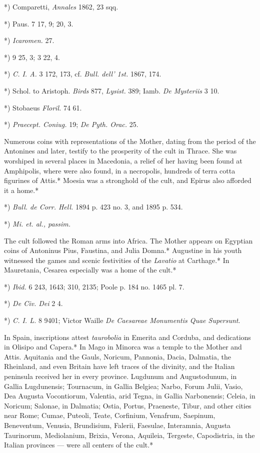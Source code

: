 \documentclass[a4paper, 11pt, oneside, polutonikogreek, english]{article}
\begin{document}
*) Comparetti, \emph{Annales} 1862, 23 sqq.

*) Paus. 7 17, 9; 20, 3.

*) \emph{Icaromen.} 27.

*) 9 25, 3; 3 22, 4.

*) \emph{C. I. A.} 3 172, 173, cf. \emph{Bull. dell' 1st.} 1867, 174.

*) Schol. to Aristoph. \emph{Birds} 877, \emph{Lysist.} 389; Iamb. \emph{De Mysteriis} 3 10.

*) Stobaeus \emph{Floril.} 74 61.

*) \emph{Praecept. Coniug.} 19; \emph{De Pyth. Orac.} 25.

Numerous coins with representations of the Mother, dating from the period of the Antonines and later, testify to the prosperity of the cult in Thrace. She was worshiped in several places in Macedonia, a relief of her having been found at Amphipolis, where were also found, in a necropolis, hundreds of terra cotta figurines of Attis.* Moesia was a stronghold of the cult, and Epirus also afforded it a home.*

*) \emph{Bull. de Corr. Hell.} 1894 p. 423 no. 3, and 1895 p. 534.

*) \emph{Mi. et. al., passim.}

The cult followed the Roman arms into Africa. The Mother appears on Egyptian coins of Antoninus Pius, Faustina, and Julia Domna.* Augustine in his youth witnessed the games and scenic festivities of the \emph{Lavatio} at Carthage.* In Mauretania, Cesarea especially was a home of the cult.*

*) \emph{Ibid.} 6 243, 1643; 310, 2135; Poole p. 184 no. 1465 pl. 7.

*) \emph{De Civ. Dei} 2 4.

*) \emph{C. I. L.} 8 9401; Victor Waille \emph{De Caesareae Monumentis Quae Supersunt}.

In Spain, inscriptions attest \emph{taurobolia} in Emerita and Corduba, and dedications in Olisipo and Capera.* In Mago in Minorca was a temple to the Mother and Attis. Aquitania and the Gauls, Noricum, Pannonia, Dacia, Dalmatia, the Rheinland, and even Britain have left traces of the divinity, and the Italian peninsula received her in every province. Lugdunum and Augustodunum, in Gallia Lugdunensis; Tournacum, in Gallia Belgiea; Narbo, Forum Julii, Vasio, Dea Augusta Vocontiorum, Valentia, arid Tegna, in Gallia Narbonensis; Celeia, in Noricum; Salonae, in Dalmatia; Ostia, Portus, Praeneste, Tibur, and other cities near Rome; Cumae, Puteoli, Teate, Corfinium, Venafrum, Saepinum, Beneventum, Venusia, Brundisium, Falerii, Faesulae, Interamnia, Augusta Taurinorum, Mediolanium, Brixia, Verona, Aquileia, Tergeste, Capodistria, in the Italian provinces --- were all centers of the cult.*
\end{document}
